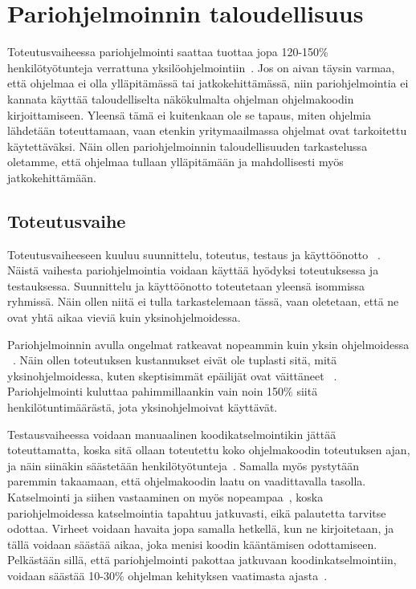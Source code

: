 \documentclass[finnish]{tktltiki2}
\theoremstyle{definition}
\theoremstyle{remark}
\begin{document}
\section{Pariohjelmoinnin taloudellisuus}

Toteutusvaiheessa pariohjelmointi saattaa tuottaa jopa 120-150\% henkilötyötunteja verrattuna yksilöohjelmointiin~\cite{williams01support}. Jos on aivan täysin varmaa, että ohjelmaa ei olla ylläpitämässä tai jatkokehittämässä, niin pariohjelmointia ei kannata käyttää taloudelliselta näkökulmalta ohjelman ohjelmakoodin kirjoittamiseen. Yleensä tämä ei kuitenkaan ole se tapaus, miten ohjelmia lähdetään toteuttamaan, vaan etenkin yritymaailmassa ohjelmat ovat tarkoitettu käytettäväksi. Näin ollen pariohjelmoinnin taloudellisuuden tarkastelussa oletamme, että ohjelmaa tullaan ylläpitämään ja mahdollisesti myös jatkokehittämään.

\subsection{Toteutusvaihe}

Toteutusvaiheeseen kuuluu suunnittelu, toteutus, testaus ja käyttöönotto  ~\cite{sommerville1998requirements}. Näistä vaihesta pariohjelmointia voidaan käyttää hyödyksi toteutuksessa ja testauksessa. Suunnittelu ja käyttöönotto toteutetaan yleensä isommissa ryhmissä. Näin ollen niitä ei tulla tarkastelemaan tässä, vaan oletetaan, että ne ovat yhtä aikaa vieviä kuin yksinohjelmoidessa.

Pariohjelmoinnin avulla ongelmat ratkeavat nopeammin kuin yksin ohjelmoidessa ~\cite{costandbenefit}. Näin ollen toteutuksen kustannukset eivät ole tuplasti sitä, mitä yksinohjelmoidessa, kuten skeptisimmät epäilijät ovat väittäneet ~\cite{costandbenefit2}. Pariohjelmointi kuluttaa pahimmillaankin vain noin 150\% siitä henkilötuntimäärästä, jota yksinohjelmoivat käyttävät.

Testausvaiheessa voidaan manuaalinen koodikatselmointikin jättää toteuttamatta, koska sitä ollaan toteutettu koko ohjelmakoodin toteutuksen ajan, ja näin siinäkin säästetään henkilötyötunteja~\cite{nawrocki01exp}. Samalla myös pystytään paremmin takaamaan, että ohjelmakoodin laatu on vaadittavalla tasolla. Katselmointi ja siihen vastaaminen on myös nopeampaa~\cite{costandbenefit2}, koska pariohjelmoidessa katselmointia tapahtuu jatkuvasti, eikä palautetta tarvitse odottaa. Virheet voidaan havaita jopa samalla hetkellä, kun ne kirjoitetaan, ja tällä voidaan säästää aikaa, joka menisi koodin kääntämisen odottamiseen. Pelkästään sillä, että pariohjelmointi pakottaa jatkuvaan koodinkatselmointiin, voidaan säästää 10-30\% ohjelman kehityksen vaatimasta ajasta~\cite{gilb1993software}.
\end{document}
